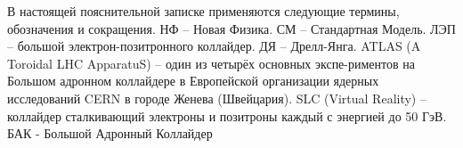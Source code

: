 В настоящей пояснительной записке применяются следующие термины, обозначения и сокращения.
НФ – Новая Физика.
СМ – Стандартная Модель.
ЛЭП – большой электрон-позитронного коллайдер.
ДЯ – Дрелл-Янга.
ATLAS (A Toroidal LHC ApparatuS) – один из четырёх основных экспе-риментов на Большом адронном коллайдере в Европейской организации ядерных исследований CERN в городе Женева (Швейцария).
SLC (Virtual Reality) – коллайдер сталкивающий электроны и позитроны каждый с энергией до 50 ГэВ.
БАК - Большой Адронный Коллайдер